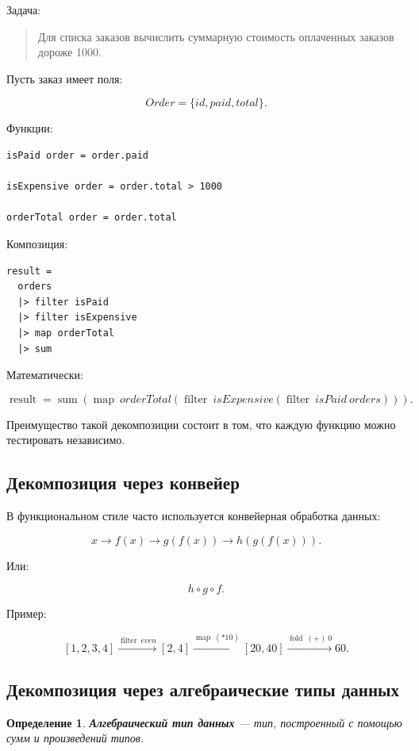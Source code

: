 \documentclass[12pt,a4paper]{article}
\newtheorem{definition}{Определение}
\begin{document}
Задача:

\begin{quote}
Для списка заказов вычислить суммарную стоимость оплаченных заказов дороже 1000.
\end{quote}

Пусть заказ имеет поля:

\[
Order = \{id, paid, total\}.
\]

Функции:

\begin{lstlisting}
isPaid order = order.paid

isExpensive order = order.total > 1000

orderTotal order = order.total
\end{lstlisting}

Композиция:

\begin{lstlisting}
result =
  orders
  |> filter isPaid
  |> filter isExpensive
  |> map orderTotal
  |> sum
\end{lstlisting}

Математически:

\[
\operatorname{result}
=
\operatorname{sum}
(
\operatorname{map}\ orderTotal
(
\operatorname{filter}\ isExpensive
(
\operatorname{filter}\ isPaid\ orders
))).
\]

Преимущество такой декомпозиции состоит в том, что каждую функцию можно тестировать независимо.

\subsection{Декомпозиция через конвейер}

В функциональном стиле часто используется конвейерная обработка данных:

\[
x
\to f(x)
\to g(f(x))
\to h(g(f(x))).
\]

Или:

\[
h \circ g \circ f.
\]

Пример:

\[
[1,2,3,4]
\xrightarrow{\operatorname{filter}\ even}
[2,4]
\xrightarrow{\operatorname{map}\ (*10)}
[20,40]
\xrightarrow{\operatorname{fold}\ (+)\ 0}
60.
\]

\subsection{Декомпозиция через алгебраические типы данных}

\begin{definition}
\textbf{Алгебраический тип данных} --- тип, построенный с помощью сумм и произведений типов.
\end{definition}
\end{document}
